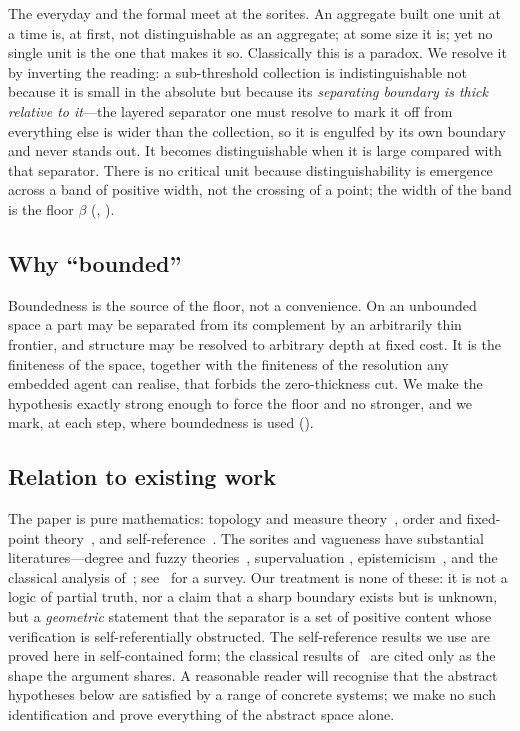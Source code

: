 \documentclass[11pt,a4paper]{article}
\theoremstyle{thmstyle}
\theoremstyle{definition}
\theoremstyle{remark}
\newcommand{\thick}{\beta}
\begin{document}
The everyday and the formal meet at the sorites. An aggregate built one unit
at a time is, at first, not distinguishable as an aggregate; at some size it
is; yet no single unit is the one that makes it so. Classically this is a
paradox. We resolve it by inverting the reading: a sub-threshold collection is
indistinguishable not because it is small in the absolute but because its
\emph{separating boundary is thick relative to it}---the layered separator one
must resolve to mark it off from everything else is wider than the collection,
so it is engulfed by its own boundary and never stands out. It becomes
distinguishable when it is large compared with that separator. There is no
critical unit because distinguishability is emergence across a band of
positive width, not the crossing of a point; the width of the band is the
floor $\thick$ (, ).

\subsection{Why ``bounded''}

Boundedness is the source of the floor, not a convenience. On an unbounded
space a part may be separated from its complement by an arbitrarily thin
frontier, and structure may be resolved to arbitrary depth at fixed cost. It
is the finiteness of the space, together with the finiteness of the resolution
any embedded agent can realise, that forbids the zero-thickness cut. We make
the hypothesis exactly strong enough to force the floor and no stronger, and
we mark, at each step, where boundedness is used ().

\subsection{Relation to existing work}

The paper is pure mathematics: topology and measure theory~\citep{kelley1955,%
munkres2000,halmos1950,federer1969,mattila1995,engelking1995,hurewicz1941},
order and fixed-point theory~\citep{birkhoff1967,daveypriestley2002,%
tarski1955}, and self-reference~\citep{russell1903,cantor1891,tarski1936,%
godel1931,lawvere1969}. The sorites and vagueness have substantial
literatures---degree and fuzzy theories~\citep{zadeh1965}, supervaluation
\citep{fine1975,keefe2000}, epistemicism~\citep{williamson1994}, and the
classical analysis of~\citet{black1937}; see~\citet{hyderaffman2018} for a
survey. Our treatment is none of these: it is not a logic of partial truth,
nor a claim that a sharp boundary exists but is unknown, but a
\emph{geometric} statement that the separator is a set of positive content
whose verification is self-referentially obstructed. The self-reference
results we use are proved here in self-contained form; the classical results
of~\citet{russell1903,cantor1891,tarski1936} are cited only as the shape the
argument shares. A reasonable reader will recognise that the abstract
hypotheses below are satisfied by a range of concrete systems; we make no such
identification and prove everything of the abstract space alone.
\end{document}
